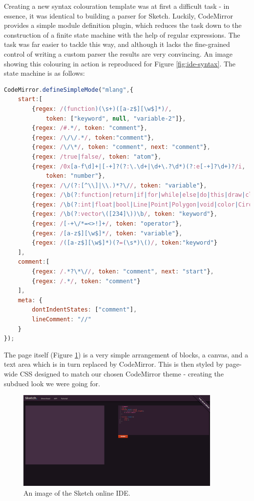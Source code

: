 \documentclass{l3proj}
\begin{document}
Creating a new syntax colouration template was at first a difficult task - in essence, it was identical to building a parser for Sketch. Luckily, CodeMirror provides a simple module definition plugin, which reduces the task down to the construction of a finite state machine with the help of regular expressions. The task was far easier to tackle this way, and although it lacks the fine-grained control of writing a custom parser the results are very convincing. An image showing this colouring in action is reproduced for Figure \ref{fig:ide-syntax}. The state machine is as follows:
\lstset{%
      basicstyle=\ttfamily\footnotesize\bfseries,
      xleftmargin=.05\textwidth, xrightmargin=.05\textwidth,
      captionpos=b,
      tabsize=4
    }
\begin{lstlisting}[caption={Syntax Highlighting State Machine},label={lst:ide-fsm},language=JavaScript]
CodeMirror.defineSimpleMode("mlang",{
    start:[
		{regex: /(function)(\s+)([a-z$][\w$]*)/,
			token: ["keyword", null, "variable-2"]},
		{regex: /#.*/, token: "comment"},
		{regex: /\/\/.*/, token:"comment"},
		{regex: /\/\*/, token: "comment", next: "comment"},
		{regex: /true|false/, token: "atom"},
		{regex: /0x[a-f\d]+|[-+]?(?:\.\d+|\d+\.?\d*)(?:e[-+]?\d+)?/i,
			token: "number"},
		{regex: /\/(?:[^\\]|\\.)*?\//, token: "variable"},
		{regex: /\b(?:function|return|if|for|while|else|do|this|draw|clear|width|height)\b/, token: "keyword"},
		{regex: /\b(?:int|float|bool|Line|Point|Polygon|void|color|Circle)\b/, token: "keyword"},
		{regex: /\b(?:vector\([234]\))\b/, token: "keyword"},
		{regex: /[-+\/*=<>!]+/, token: "operator"},
		{regex: /[a-z$][\w$]*/, token: "variable"},
		{regex: /([a-z$][\w$]*)(?=(\s*)\()/, token:"keyword"}
    ],
    comment:[
		{regex: /.*?\*\//, token: "comment", next: "start"},
		{regex: /.*/, token: "comment"}
    ],
    meta: {
        dontIndentStates: ["comment"],
        lineComment: "//"
    }
});
\end{lstlisting}

The page itself (Figure \ref{fig:ide-full}) is a very simple arrangement of blocks, a canvas, and a text area which is in turn replaced by CodeMirror. This is then styled by page-wide CSS designed to match our chosen CodeMirror theme - creating the subdued look we were going for.

\begin{figure}[!h]
\centering
\includegraphics[width=0.9\textwidth]{images/sketch-ide}
\caption{An image of the Sketch online IDE.}
\label{fig:ide-full}
\end{figure}
\end{document}
